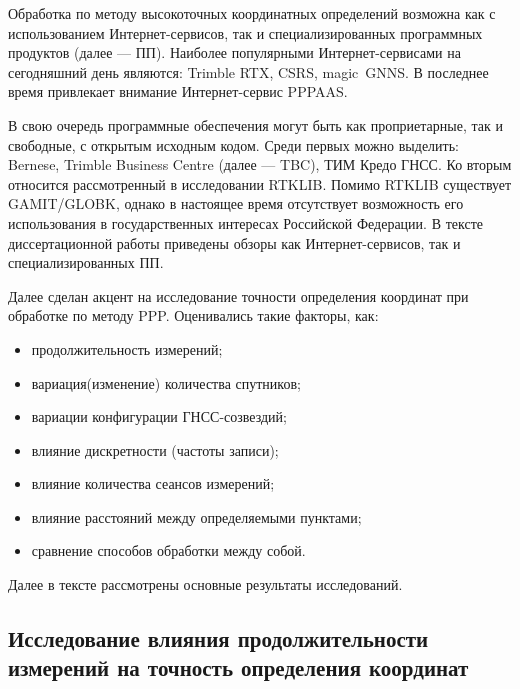 \ifsynopsis %
Обработка по методу высокоточных координатных определений возможна как с использованием Интернет-сервисов, так и специализированных программных продуктов (далее --- ПП). Наиболее популярными Интернет-сервисами на сегодняшний день являются: Trimble RTX, CSRS, magic~GNNS. В последнее время привлекает внимание Интернет-сервис PPPAAS.

В свою очередь программные обеспечения могут быть как проприетарные, так и свободные, с открытым исходным кодом. Среди первых можно выделить: Bernese, Trimble Business Centre (далее --- TBC), ТИМ Кредо ГНСС.  Ко вторым относится рассмотренный в исследовании RTKLIB. Помимо RTKLIB существует GAMIT/GLOBK, однако в настоящее время отсутствует возможность его использования в государственных интересах Российской Федерации. В тексте диссертационной работы приведены обзоры как Интернет-сервисов, так и специализированных ПП.

Далее сделан акцент на исследование точности определения координат при обработке по методу PPP. Оценивались такие факторы, как: 
\begin{itemize}
	\item продолжительность измерений; 
	\item вариация(изменение) количества спутников; 
	\item вариации конфигурации ГНСС-созвездий; 
	\item влияние дискретности (частоты записи); 
	\item влияние количества сеансов измерений; 
	\item влияние расстояний между определяемыми пунктами; 
	\item сравнение способов обработки между собой.
\end{itemize}

Далее в тексте рассмотрены основные результаты исследований.

\subsection*{Исследование влияния продолжительности измерений на точность определения координат}



